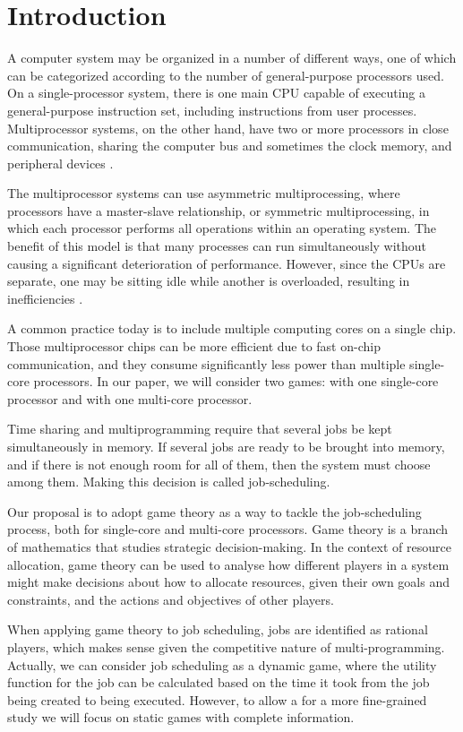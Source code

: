 \section{Introduction}
A computer system may be organized in a number of different ways, 
one of which can be categorized according to the number of 
general-purpose processors used. On a single-processor system, 
there is one main CPU capable of executing a general-purpose instruction 
set, including instructions from user processes.
Multiprocessor systems, on the other hand, have two or more processors 
in close communication, sharing the computer bus and sometimes the clock
 memory, and peripheral devices \cite{10.5555/2490781}.

The multiprocessor systems can use asymmetric multiprocessing, 
where processors have a master-slave relationship, 
or symmetric multiprocessing, in which each processor performs all 
operations within an operating system. 
The benefit of this model is that many processes can run simultaneously 
without causing a significant deterioration of performance. 
However, since the CPUs are separate, one may be sitting idle while 
another is overloaded, resulting in inefficiencies \cite{10.1145/1463822.1463838}.

A common practice today is to include multiple computing cores on a 
single chip. 
Those multiprocessor chips can be more efficient due to fast 
on-chip communication, and they consume significantly less power than 
multiple single-core processors. 
In our paper, we will consider two games: with one single-core processor 
and with one multi-core processor. 

Time sharing and multiprogramming require that several jobs be kept simultaneously in memory. 
If several jobs are ready to be brought into memory, and if there is not enough room for all of them,
then the system must choose among them. 
Making this decision is called job-scheduling. 

Our proposal is to adopt game theory as a way to tackle the job-scheduling process, 
both for single-core and multi-core processors. 
Game theory is a branch of mathematics that studies strategic decision-making. 
In the context of resource allocation, game theory can be used to analyse how 
different players in a system might make decisions about how to allocate resources, 
given their own goals and constraints, and the actions and objectives of other players. 

When applying game theory to job scheduling, jobs are identified as rational players, 
which makes sense given the competitive nature of multi-programming. 
Actually, we can consider job scheduling as a dynamic game, where the utility 
function for the job can be calculated based on the time it took from the job being 
created to being executed. However, to allow a for a more fine-grained study we will 
focus on static games with complete information.

